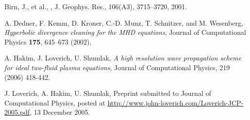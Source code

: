 \documentclass[12pt,fleqn]{article}
\numberwithin{equation}{section}
\begin{document}
\begin{thebibliography}{99}

    Birn, J., et al.,
    ,
    J. Geophys. Res., 106(A3), 3715--3720, 2001.

    A. Dedner, F. Kemm, D. Kr\:oner, C.-D. Munz, 
    T. Schnitzer, and M. Wesenberg,
    {\em Hyperbolic divergence cleaning 
    for the MHD equations},
    Journal of Computational Physics {\bf 175}, 645--673 (2002).

     A. Hakim, J. Loverich, U. Shumlak,
     \newblock \emph{A high resolution wave propagation scheme for
       ideal two-fluid plasma equations},
     \newblock Journal of Computational Physics, 219 (2006) 418-442.

    J. Loverich, A. Hakim, U. Shumlak,
    \newblock Preprint submitted
    to Journal of Computational Physics, posted at
    \url{http://www.john-loverich.com/Loverich-JCP-2005.pdf},
    13 December 2005.

\end{thebibliography}
\end{document}
